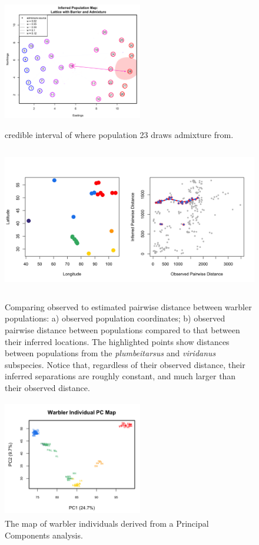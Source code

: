 \documentclass[12pt]{article}
\begin{document}
\begin{figure}[ht!]
	\centering
		{\includegraphics[width=2.4in,height=2in]{figs/sims/GeoGenMap_barr_inland_admixture_2.png}}
	\caption{credible interval of where population 23 draws admixture from.}
\label{sfig:barr_inland_ad_credset}
\end{figure}

\begin{figure}
\centering
	{\includegraphics[width=6in,height=2.5in]{figs/warblers/warb_pop_dist_compare.png}}
	\caption{Comparing observed to estimated pairwise distance between warbler populations: a) observed population coordinates; b) observed pairwise distance between populations compared to that between their inferred locations.  The highlighted points show distances between populations from the \textit{plumbeitarsus} and \textit{viridanus} subspecies.  Notice that, regardless of their observed distance, their inferred separations are roughly constant, and much larger than their observed distance.}
	\label{sfig:warb_pop_distcomp}
\end{figure}

\begin{figure}
	\centering
	\includegraphics[width=2.4in,height=2in]{figs/warblers/warb_ind_PC_map.png}
	\caption{The map of warbler individuals derived from a Principal Components analysis.}\label{sfig:warb_ind_PC_map}
\end{figure}
\end{document}
